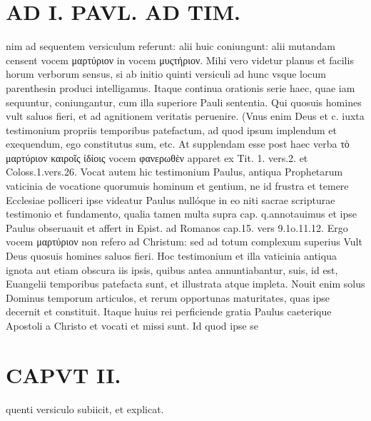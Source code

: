 \documentclass{article}
\begin{document}
\begin{pages}
\section*{AD I. PAVL. AD TIM. }
\marginpar{[ p.62 ]}\pstart nim ad sequentem versiculum referunt: alii huic coniungunt: alii mutandam censent vocem μαρτύριον in vocem μυςτήριον. Mihi vero videtur planus et facilis horum verborum sensus, si ab initio quinti versiculi ad hunc vsque locum parenthesin produci intelligamus. Itaque continua orationis serie haec, quae iam sequuntur, coniungantur, cum illa superiore Pauli sententia. Qui quosuis homines vult saluos fieri, et ad agnitionem veritatis peruenire. (Vnus enim Deus et c. iuxta testimonium propriis temporibus patefactum, ad quod ipsum implendum et exequendum, ego constitutus sum, etc. At supplendam esse post haec verba τὸ μαρτύριον καιροῖς ἰδίοις vocem φανερωθὲν apparet ex Tit. 1. vers.2. et Coloss.1.vers.26. Vocat autem hic testimonium Paulus, antiqua Prophetarum vaticinia de vocatione quorumuis hominum et gentium, ne id frustra et temere Ecclesiae polliceri ipse videatur Paulus nullóque in eo niti sacrae scripturae testimonio et fundamento, qualia tamen multa supra cap. q.annotauimus et ipse Paulus obseruauit et affert in Epist. ad Romanos cap.15. vers 9.1o.11.12. Ergo vocem μαρτύριον non refero ad Christum: sed ad totum complexum superius Vult Deus quosuis homines saluos fieri. Hoc testimonium et illa vaticinia antiqua ignota aut etiam obscura iis ipsis, quibus antea annuntiabantur, suis, id est, Euangelii temporibus patefacta sunt, et illustrata atque impleta. Nouit enim solus Dominus temporum articulos, et rerum opportunas maturitates, quas ipse decernit et constituit. Itaque huius rei perficiende gratia Paulus caeterique  Apostoli a Christo et vocati et missi sunt. Id quod ipse se\pend
\section*{CAPVT II. }\pstart quenti versiculo subiicit, et explicat.  \pend
{}
{}

\end{pages}
\end{document}
